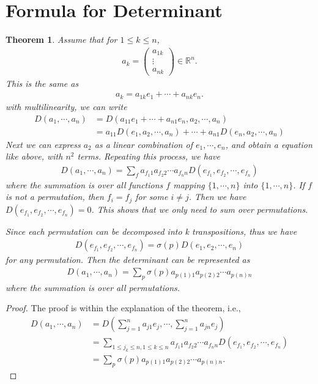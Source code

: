 \documentclass[11pt]{book}
\newtheorem{theorem}{Theorem}[section]
\theoremstyle{definition}
\numberwithin{equation}{subsection}
\begin{document}
\medskip

\section{Formula for Determinant}
\begin{theorem}
Assume that for $1\leq k \leq n$, 
\begin{align*}
    a_k = \left(
    \begin{matrix}
        a_{1k} \\
        \vdots \\
        a_{n k}
    \end{matrix}
    \right)\in\mathbb{R}^n.
\end{align*}
This is the same as 
\begin{align*}
    a_k = a_{1k}e_1 + \cdots + a_{nk}e_n.
\end{align*}
with multilinearity, we can write
\begin{align*}
    D(a_1,\cdots,a_n) & = D(a_{11}e_1 + \cdots + a_{n1}e_n, a_2,\cdots,a_n) \\
    & = a_{11}D(e_1,a_2,\cdots,a_n) + \cdots + a_{n1}D(e_n,a_2,\cdots,a_n)
\end{align*}
Next we can express $a_2$ as a linear combination of $e_1,\cdots,e_n$, and obtain a equation like above, with $n^2$ terms. Repeating this process, we have
\begin{align*}
    D(a_1,\cdots,a_n) = \sum_f a_{f_1 1}a_{f_2 2}\cdots a_{f_n n} D(e_{f_1}, e_{f_2},\cdots, e_{f_n})
\end{align*}
where the summation is over all functions $f$ mapping $\{1,\cdots,n\}$ into $\{1,\cdots,n\}$. If $f$ is not a permutation, then $f_i = f_j$ for some $i\neq j$. Then we have $D(e_{f_1}, e_{f_2},\cdots, e_{f_n}) = 0$. This shows that we only need to sum over permutations.

Since each permutation can be decomposed into k transpositions, thus we have 
\begin{align*}
    D(e_{f_1}, e_{f_2},\cdots, e_{f_n}) = \sigma(p) D(e_1, e_2,\cdots, e_n)
\end{align*}
for any permutation. Then the determinant can be represented as
\begin{align*}
    D(a_1,\cdots,a_n) = \sum_p \sigma(p) a_{p(1)1} a_{p(2)2} \cdots a_{p(n)n}
\end{align*}
where the summation is over all permutations.
\end{theorem}
\begin{proof}
The proof is within the explanation of the theorem, i.e., 
\begin{align*}
    D(a_1,\cdots,a_n) & = D\left(\sum^n_{j=1}a_{j1}e_j, \cdots, \sum^n_{j=1}a_{jn}e_j\right) \\
    & = \sum_{1\leq j_k \leq n, 1\leq k \leq n} a_{f_1 1}a_{f_2 2}\cdots a_{f_n n} D(e_{f_1}, e_{f_2},\cdots, e_{f_n}) \\
    & = \sum_p \sigma(p) a_{p(1)1} a_{p(2)2} \cdots a_{p(n)n}.
\end{align*}
\end{proof}
\end{document}
